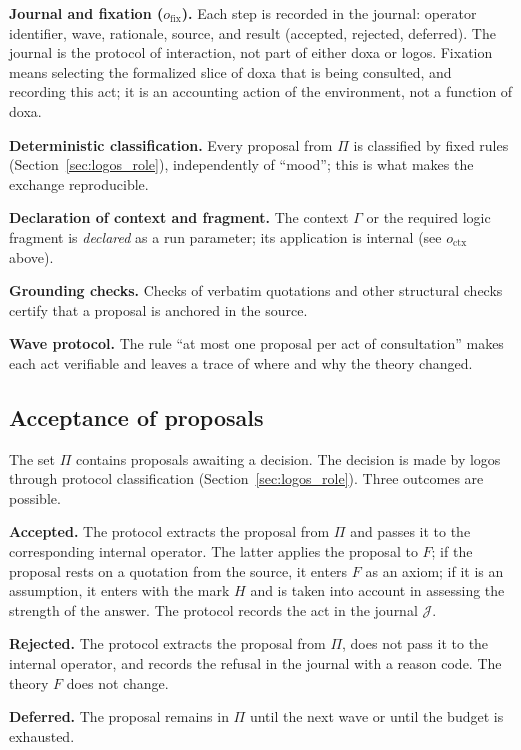 \documentclass[12pt,a4paper]{article}
\begin{document}
\textbf{Journal and fixation ($o_{\text{fix}}$).} Each step is recorded in the
journal: operator identifier, wave, rationale, source, and result (accepted,
rejected, deferred). The journal is the protocol of interaction, not part of
either doxa or logos. Fixation means selecting the formalized slice of doxa
that is being consulted, and recording this act; it is an accounting action of
the environment, not a function of doxa.

\textbf{Deterministic classification.} Every proposal from $\Pi$ is classified
by fixed rules (Section~\ref{sec:logos_role}), independently of ``mood''; this
is what makes the exchange reproducible.

\textbf{Declaration of context and fragment.} The context $\Gamma$ or the
required logic fragment is \emph{declared} as a run parameter; its application
is internal (see $o_{\text{ctx}}$ above).

\textbf{Grounding checks.} Checks of verbatim quotations and other structural
checks certify that a proposal is anchored in the source.

\textbf{Wave protocol.} The rule ``at most one proposal per act of
consultation'' makes each act verifiable and leaves a trace of where and why
the theory changed.

\subsection{Acceptance of proposals}
\label{sec:acceptance}

The set $\Pi$ contains proposals awaiting a decision. The decision is made by
logos through protocol classification (Section~\ref{sec:logos_role}). Three
outcomes are possible.

\textbf{Accepted.} The protocol extracts the proposal from $\Pi$ and passes it
to the corresponding internal operator. The latter applies the proposal to
$F$; if the proposal rests on a quotation from the source, it enters $F$ as an
axiom; if it is an assumption, it enters with the mark $H$ and is taken into
account in assessing the strength of the answer. The protocol records the act
in the journal $\mathcal{J}$.

\textbf{Rejected.} The protocol extracts the proposal from $\Pi$, does not
pass it to the internal operator, and records the refusal in the journal with
a reason code. The theory $F$ does not change.

\textbf{Deferred.} The proposal remains in $\Pi$ until the next wave or until
the budget is exhausted.
\end{document}
